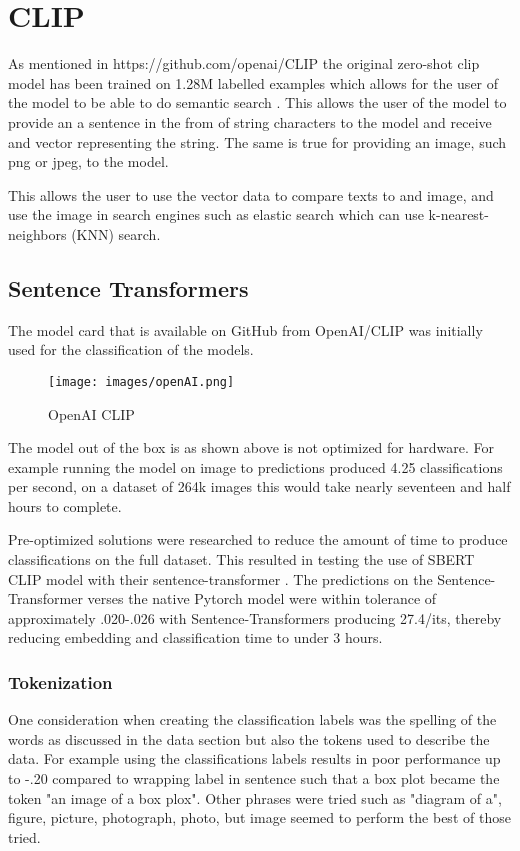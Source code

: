 \documentclass[letterpaper, 10 pt, conference]{ieeeconf}  %
\begin{document}
\section{CLIP}
As mentioned in https://github.com/openai/CLIP the original zero-shot clip model has been
trained on 1.28M labelled examples which allows for the user of the model to be able to do
semantic search \cite{OpenAI}. This allows the user of the model to provide an a sentence in 
the from of string characters to the model and receive and vector representing the string. The 
same is true for providing an image, such png or jpeg, to the model. 

This allows the user to use the vector data to compare texts to and image, and use the image in search engines
 such as elastic search which can use  k-nearest-neighbors (KNN) search. 

\subsection{Sentence Transformers}
The model card that is available on GitHub from OpenAI/CLIP was initially used for the classification of the models.

\begin{figure}
    \centering
    \texttt{[image: images/openAI.png]}
    \caption{OpenAI CLIP \cite{OpenAI}}
    \label{fig:openAI-clip}
\end{figure}

The model out of the box is as shown above is not optimized for hardware. For example running the model on 
image to predictions produced 4.25 classifications per second, on a dataset of 264k images this would take 
nearly seventeen and half hours to complete. 

Pre-optimized solutions were researched to reduce the amount of time to produce classifications on the full 
dataset. This resulted in testing the use of SBERT CLIP model with their sentence-transformer \cite{SBERT}.
The predictions on the Sentence-Transformer verses the native Pytorch model were within
tolerance of approximately .020-.026 with Sentence-Transformers producing 27.4/its, thereby reducing embedding
and classification time to under 3 hours.

\subsubsection{Tokenization}
One consideration when creating the classification labels was the spelling of the words as discussed in the 
data section but also the tokens used to describe the data. For example using the classifications labels 
results in poor performance up to -.20 compared to wrapping label in sentence such that a box plot became the
token "an image of a box plox". Other phrases were tried such as "diagram of a", figure, picture, photograph,
 photo, but image seemed to perform the best of those tried. 
\end{document}
